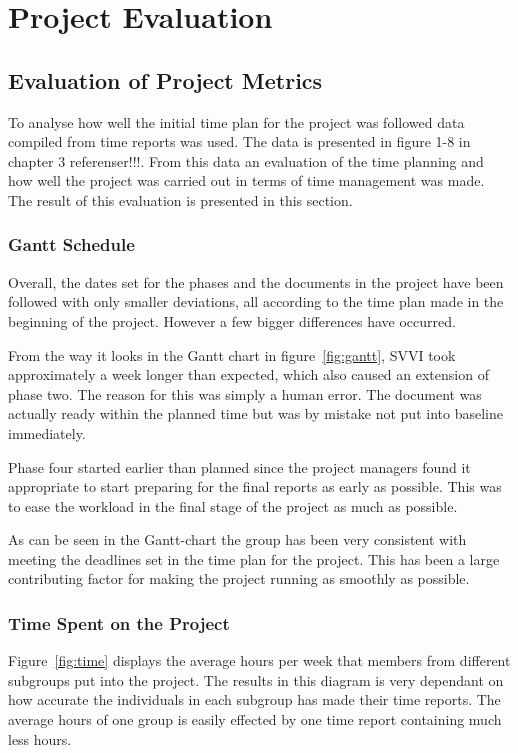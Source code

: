 \documentclass[a4paper]{article}
\begin{document}
\FloatBarrier
\section{Project Evaluation}


\subsection{Evaluation of Project Metrics}
\label{sec:meval}

To analyse how well the initial time plan for the project was followed data compiled from time reports was used. The data is presented in figure 1-8 in chapter 3 referenser!!!. From this data an evaluation of the time planning and how well the project was carried out in terms of time management was made. The result of this  evaluation is presented in this section.   

\subsubsection{Gantt Schedule}
Overall, the dates set for the phases and the documents in the project have been followed with only smaller deviations, all according to the time plan made in the beginning of the project. However a few bigger differences have occurred.

From the way it looks in the Gantt chart in figure~\ref{fig:gantt}, SVVI took approximately a week longer than expected, which also caused an extension of phase two. The reason for this was simply a human error. The document was actually ready within the planned time but was by mistake not put into baseline immediately. 

Phase four started earlier than planned since the project managers found it appropriate to start preparing for the final reports as early as possible. This was to ease the workload in the final stage of the project as much as possible.

As can be seen in the Gantt-chart the group has been very consistent with meeting the deadlines set in the time plan for the project. This has been a large contributing factor for making the project running as smoothly as possible.

\subsubsection{Time Spent on the Project}
Figure~\ref{fig:time} displays the average hours per week that members from different subgroups put into the project. The results in this diagram is very dependant on how accurate the individuals in each subgroup has made their time reports. The average hours of one group is easily effected by one time report containing much less hours. 
\end{document}
